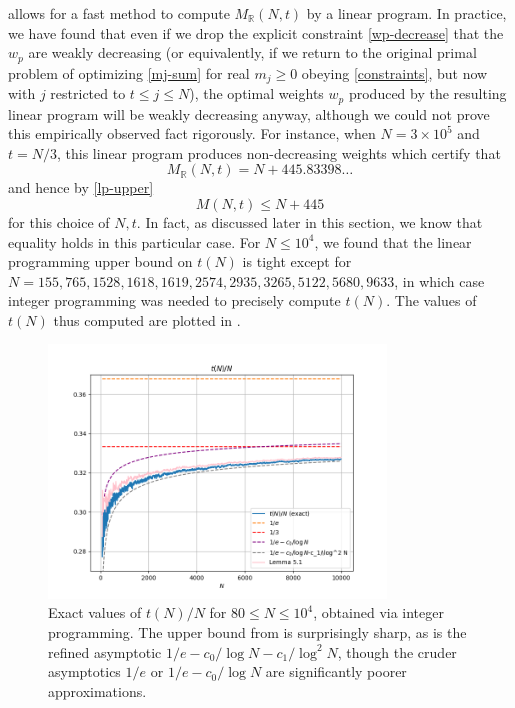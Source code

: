 \documentclass[12pt,a4paper,reqno]{amsart}
\numberwithin{equation}{section}
\theoremstyle{plain}
\theoremstyle{definition}
\newcommand\R{\mathbb{R}}
\begin{document}
 allows for a fast method to compute $M_\R(N,t)$ by a linear program.  In practice, we have found that even if we drop the explicit constraint \eqref{wp-decrease} that the $w_p$ are weakly decreasing (or equivalently, if we return to the original primal problem of optimizing \eqref{mj-sum} for real $m_j \geq 0$ obeying \eqref{constraints}, but now with $j$ restricted to $t \leq j \leq N$), the optimal weights $w_p$ produced by the resulting linear program will be weakly decreasing anyway, although we could not prove this empirically observed fact rigorously.  For instance, when $N = 3 \times 10^5$ and $t = N/3$, this linear program produces non-decreasing weights which certify that
$$ M_\R(N,t) = N + 445.83398\dots$$
and hence by \eqref{lp-upper}
\begin{equation}\label{mnt}
  M(N,t) \leq N + 445
\end{equation}
for this choice of $N,t$.  In fact, as discussed later in this section, we know that equality holds in this particular case.  For $N \leq 10^4$, we found that the linear programming upper bound on $t(N)$ is tight except for
$N=155,765,1528,1618,1619,2574,2935,3265,5122,5680,9633$, in which case integer programming was needed to precisely compute $t(N)$.  The values of $t(N)$ thus computed are  plotted in .

\begin{figure}
  \centering
  \includegraphics[width=0.8\textwidth]{longplot.png}
  \vspace{-8pt}
  \caption{Exact values of $t(N)/N$ for $80 \leq N \leq 10^4$, obtained via integer programming.  The upper bound from  is surprisingly sharp, as is the refined asymptotic $1/e - c_0/\log N - c_1/\log^2 N$, though the cruder asymptotics $1/e$ or $1/e - c_0/\log N$ are significantly poorer approximations.}
  \label{fig-long}
  \end{figure}
\end{document}
